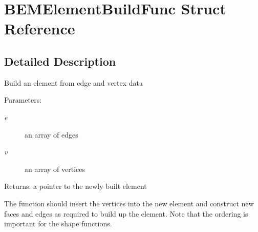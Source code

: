 \section{BEMElementBuildFunc Struct Reference}
\label{structBEMElementBuildFunc}


\subsection{Detailed Description}
Build an element from edge and vertex data

\begin{Desc}
\item[Parameters:]
\begin{description}
\item[{\em e}]an array of edges \item[{\em v}]an array of vertices\end{description}
\end{Desc}
\begin{Desc}
\item[Returns:]a pointer to the newly built element\end{Desc}
The function should insert the vertices into the new element and construct new faces and edges as required to build up the element. Note that the ordering is important for the shape functions. 

